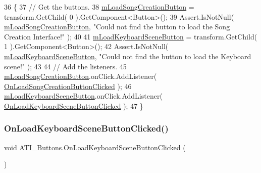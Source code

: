 \begin{DoxyCode}
36     \{
37         \textcolor{comment}{// Get the buttons.}
38         \hyperlink{group___a_t_i_buttons_priv_var_ga8ab732143834bd94387cfd94c59886da}{mLoadSongCreationButton} = transform.GetChild( 0 ).GetComponent<Button>();
39         Assert.IsNotNull( \hyperlink{group___a_t_i_buttons_priv_var_ga8ab732143834bd94387cfd94c59886da}{mLoadSongCreationButton}, \textcolor{stringliteral}{"Could not find the button to
       load the Song Creation Interface!"} );
40 
41         \hyperlink{group___a_t_i_buttons_priv_var_ga7b2f643a87f99b6a35a2d64330c8a9d4}{mLoadKeyboardSceneButton} = transform.GetChild( 1 ).GetComponent<Button>();
42         Assert.IsNotNull( \hyperlink{group___a_t_i_buttons_priv_var_ga7b2f643a87f99b6a35a2d64330c8a9d4}{mLoadKeyboardSceneButton}, \textcolor{stringliteral}{"Could not find the button to
       load the Keyboard scene!"} );
43 
44         \textcolor{comment}{// Add the listeners.}
45         \hyperlink{group___a_t_i_buttons_priv_var_ga8ab732143834bd94387cfd94c59886da}{mLoadSongCreationButton}.onClick.AddListener( 
      \hyperlink{group___a_t_i_buttons_unity_ga6f6e66c53a80c3bcd9b7e7238a3b82fd}{OnLoadSongCreationButtonClicked} );
46         \hyperlink{group___a_t_i_buttons_priv_var_ga7b2f643a87f99b6a35a2d64330c8a9d4}{mLoadKeyboardSceneButton}.onClick.AddListener( 
      \hyperlink{group___a_t_i_buttons_unity_ga1b9e9b75184e9e26309cc14bda37ad8a}{OnLoadKeyboardSceneButtonClicked} );
47     \}
\end{DoxyCode}
\mbox{\label{group___a_t_i_buttons_unity_ga1b9e9b75184e9e26309cc14bda37ad8a}} 
\subsubsection{\texorpdfstring{On\+Load\+Keyboard\+Scene\+Button\+Clicked()}{OnLoadKeyboardSceneButtonClicked()}}
{\footnotesize\ttfamily void A\+T\+I\+\_\+\+Buttons.\+On\+Load\+Keyboard\+Scene\+Button\+Clicked (\begin{DoxyParamCaption}{ }\end{DoxyParamCaption})\hspace{0.3cm}{\ttfamily [private]}}



